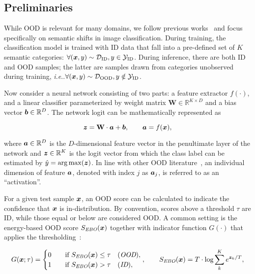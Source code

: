 \documentclass{article} %
\makeatletter
\theoremstyle{plain}
\DeclareRobustCommand\onedot{\futurelet\@let@token\@onedot}
\def\@onedot{\ifx\@let@token.\else.\null\fi\xspace}
\def\ie{\emph{i.e}\onedot} \def\Ie{\emph{I.e}\onedot}
\newcommand{\logit}{\vz}  %
\newcommand{\pF}{\va}     %
\makeatother
\begin{document}
\subsection{Preliminaries}

While OOD is relevant for many domains, we follow previous works~\citep{DBLP:conf/nips/YangWZZDPWCLSDZ22/OpenOOD} and focus specifically on semantic shifts in image classification.
During training, the classification model is trained with ID data that fall into a pre-defined set of $K$ semantic categories: $\forall ({\bm{x}},y)\sim \mathcal{D}_{\text{ID}}, y \in \mathcal{Y}_{\text{ID}}$. During inference, there are both ID and OOD samples; the latter are samples drawn from categories unobserved during training, 
\ie $\forall ({\bm{x}},y)\sim \mathcal{D}_{\text{OOD}}, y \notin \mathcal{Y}_{\text{ID}}$.

Now consider a neural network consisting of two parts: a feature extractor $f(\cdot)$, and a linear classifier parameterized by weight matrix $\mathbf{W}\in \mathbb{R}^{K\times D}$ and a bias vector ${\bm{b}} \in \mathbb{R}^{D}$. The network logit can be mathematically represented as

\begin{equation}
    \logit = \mathbf{W} \cdot \pF + \vb, \qquad \pF = f(\vx), 
\end{equation}

where $\pF\in\mathbb{R}^{D}$ is the $D$-dimensional feature vector in the penultimate layer of the network and $\logit \in \mathbb{R}^{K}$ is the logit vector from which the class label can be estimated by $\hat{y} = \argmax(\logit)$.  In line with other OOD literature~\citep{DBLP:conf/nips/SunGL21/ReAct}, an individual dimension of feature $\pF$, denoted with index $j$ as $\pF_j$, is referred to as an ``activation''. 

For a given test sample ${\bm{x}}$, an OOD score can be calculated to indicate the confidence that ${\bm{x}}$ is in-distribution. By convention, scores above a threshold $\tau$ are ID, while those equal or below are considered OOD. A common setting is the energy-based OOD score $S_{\textit{EBO}}({\bm{x}})$ together with indicator function $G(\cdot)$ that applies the thresholding~\citep{DBLP:conf/nips/LiuWOL20/EBO}:

\begin{align}\label{eq:OODscore}
G(\vx; \tau) =
\begin{cases}
0 & \quad \text{if } S_{\textit{EBO}}(\vx) \leq \tau \quad(\textit{OOD}), \\
1 & \quad \text{if } S_{\textit{EBO}}(\vx) > \tau \quad (\textit{ID}),
\end{cases},  \qquad  S_{\textit{EBO}}(\vx) = T\cdot \text{log}\sum_k^K e^{\logit_k/T},
\end{align}
\end{document}
